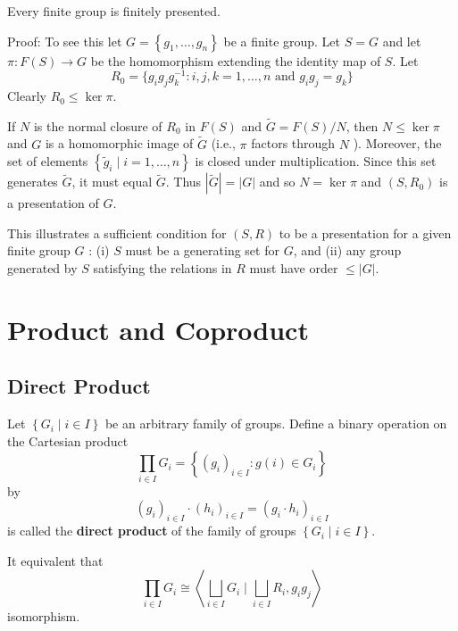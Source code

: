 \begin{theorem}
    Every finite group is finitely presented.

    Proof:
    To see this let $G=\left\{g_1, \ldots, g_n\right\}$ be a finite group.
    Let $S=G$ and let $\pi: F(S) \rightarrow G$ be the homomorphism extending the identity map of $S$.
    Let
    \[
        R_0
        =
        \{
        g_ig_jg_k^{-1}
        :
        i, j,k=1, \ldots, n \text{ and } g_i g_j=g_k
        \}
    \]
    Clearly $R_0 \leq \operatorname{ker} \pi$.

    If $N$ is the normal closure of $R_0$ in $F(S)$ and $\widetilde{G}=F(S) / N$, then $N\leq \ker \pi$ and $G$ is a homomorphic image of $\widetilde{G}$ (i.e., $\pi$ factors through $N$ ). Moreover, the set of elements $\left\{\widetilde{g}_i \mid i=1, \ldots, n\right\}$ is closed under multiplication. Since this set generates $\widetilde{G}$, it must equal $\widetilde{G}$. Thus $|\widetilde{G}|=|G|$ and so $N=\operatorname{ker} \pi$ and $\left(S, R_0\right)$ is a presentation of $G$.

    This illustrates a sufficient condition for $(S, R)$ to be a presentation for a given finite group $G$ :
    (i) $S$ must be a generating set for $G$, and
    (ii) any group generated by $S$ satisfying the relations in $R$ must have order $\leq|G|$.
\end{theorem}


\section{Product and Coproduct} %
\subsection{Direct Product}
\begin{definition}
    Let $\left\{G_i \mid i \in I\right\}$ be an arbitrary family of groups.
    Define a binary operation on the Cartesian product
    \begin{equation*}
        \prod_{i \in I} G_i
        =
        \left\{\left(g_i\right)_{i\in I}: g(i) \in G_i\right\}
    \end{equation*}
    by
    \begin{equation*}
        \left(g_i\right)_{i\in I} \cdot \left(h_i\right)_{i\in I}
        =\left(g_i \cdot h_i\right)_{i\in I}
    \end{equation*}
    is called the \textbf{direct product} of the family of groups $\left\{G_i \mid i \in I\right\}$.
    \begin{remark}
        It equivalent that
        \begin{equation*}
            \prod_{i \in I} G_i
            \cong
            \left\langle \bigsqcup_{i\in I} G_i \mid   \bigsqcup_{i\in I} R_i,g_ig_j \right\rangle
        \end{equation*}
        isomorphism.
    \end{remark}
\end{definition}



